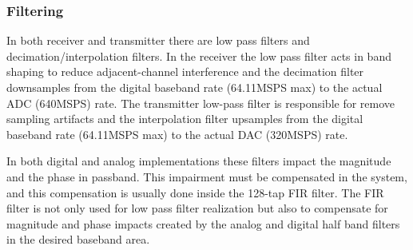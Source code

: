 \subsubsection{Filtering}


In both receiver and transmitter there are low pass filters and
decimation/interpolation filters. In the receiver the low pass filter acts in
band shaping to reduce adjacent-channel interference and the decimation filter
downsamples from the digital baseband rate (64.11MSPS max) to the actual ADC
(640MSPS) rate. The transmitter low-pass filter is responsible for remove
sampling artifacts and the interpolation filter upsamples from the digital
baseband rate (64.11MSPS max) to the actual DAC (320MSPS) rate.

In both digital and analog implementations these filters impact the magnitude
and the phase in passband. This impairment must be compensated in the system,
and this compensation is usually done inside the 128-tap FIR filter. The FIR
filter is not only used for low pass filter realization but also to compensate
for magnitude and phase impacts created by the analog and digital half band
filters in the desired baseband area.


